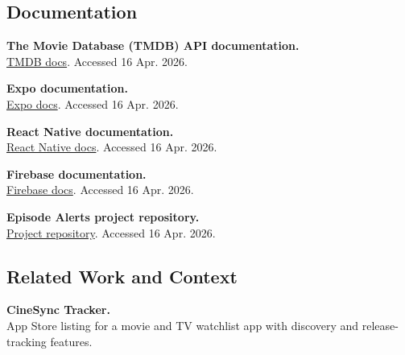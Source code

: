 \subsection*{Documentation}
\begin{enumerate}[label={[\arabic*]}, leftmargin=*, itemsep=0.8em]
	\item \textbf{The Movie Database (TMDB) API documentation.}\\
\href{https://developer.themoviedb.org/docs}{TMDB docs}. Accessed 16 Apr. 2026.
	\item \textbf{Expo documentation.}\\
\href{https://docs.expo.dev/}{Expo docs}. Accessed 16 Apr. 2026.
	\item \textbf{React Native documentation.}\\
\href{https://reactnative.dev/docs/getting-started}{React Native docs}. Accessed 16 Apr. 2026.
	\item \textbf{Firebase documentation.}\\
\href{https://firebase.google.com/docs}{Firebase docs}. Accessed 16 Apr. 2026.
	\item \textbf{Episode Alerts project repository.}\\
\href{https://github.com/TheGhossst/EpisodeAlerts-MobileApp}{Project repository}. Accessed 16 Apr. 2026.
\end{enumerate}

\subsection*{Related Work and Context}
\begin{enumerate}[label={[\arabic*]}, leftmargin=*, itemsep=0.8em]
	\item \textbf{CineSync Tracker.}\\
App Store listing for a movie and TV watchlist app with discovery and release-tracking features.\\
\end{enumerate}